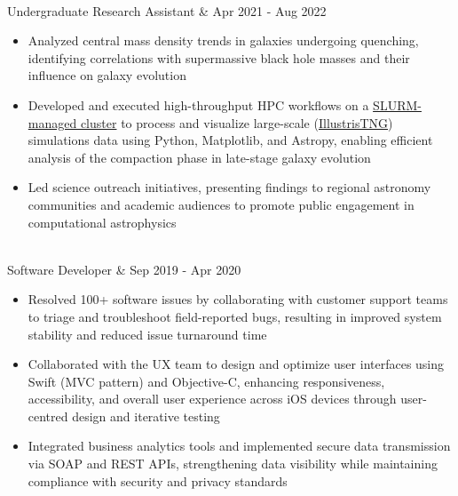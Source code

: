 \documentclass[letterpaper,11pt]{article} %
\newcommand{\resumeItem}[1]{\small{#1}\vspace{-5pt}}
\begin{document}
\vspace{5pt}
\begin{tabular*}
    \vspace{1pt}\\
    {Undergraduate Research Assistant} & {\color{TextBlack} \small Apr 2021 - Aug 2022}\\
\end{tabular*}
\vspace{-10pt}
\begin{itemize}
    \item\resumeItem{Analyzed central mass density trends in galaxies undergoing quenching, identifying correlations with supermassive black hole masses and their influence on galaxy evolution}
    \item\resumeItem{Developed and executed high-throughput HPC workflows on a \href{https://docs.alliancecan.ca/wiki/Cedar}{SLURM-managed cluster} to process and visualize large-scale (\href{https://www.tng-project.org/}{IllustrisTNG}) simulations data using Python, Matplotlib, and Astropy, enabling efficient analysis of the compaction phase in late-stage galaxy evolution}
    \item\resumeItem{Led science outreach initiatives, presenting findings to regional astronomy communities and academic audiences to promote public engagement in computational astrophysics}
\end{itemize}

\vspace{5pt}
\begin{tabular*}
    \vspace{1pt}\\
    {Software Developer} & {\color{TextBlack} \small Sep 2019 - Apr 2020}\\
\end{tabular*}
\vspace{-10pt}
\begin{itemize}
    \item\resumeItem{Resolved 100+ software issues by collaborating with customer support teams to triage and troubleshoot field-reported bugs, resulting in improved system stability and reduced issue turnaround time}
    \item\resumeItem{Collaborated with the UX team to design and optimize user interfaces using Swift (MVC pattern) and Objective-C, enhancing responsiveness, accessibility, and overall user experience across iOS devices through user-centred design and iterative testing}
    \item\resumeItem{Integrated business analytics tools and implemented secure data transmission via SOAP and REST APIs, strengthening data visibility while maintaining compliance with security and privacy standards}
\end{itemize}
\end{document}
